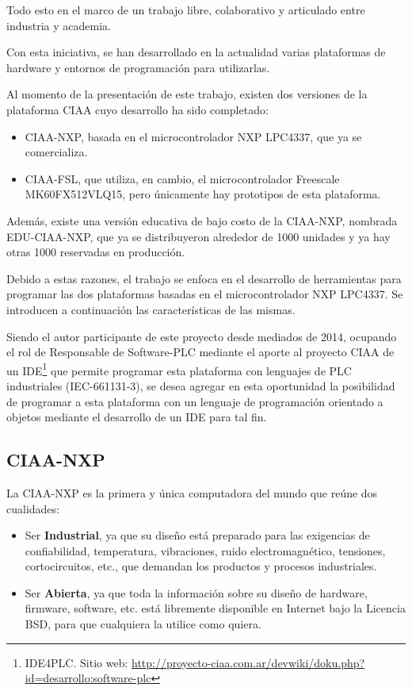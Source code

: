 \noindent Todo esto en el marco de un trabajo libre, colaborativo y articulado entre industria y academia. 

\bigskip

Con esta iniciativa, se han desarrollado en la actualidad varias plataformas de hardware y entornos de programación para utilizarlas.

\medskip

Al momento de la presentación de este trabajo, existen dos versiones de la plataforma CIAA cuyo desarrollo ha sido completado:

\begin{itemize}
\item 
CIAA-NXP, basada en el microcontrolador NXP LPC4337, que ya se comercializa.
\item 
CIAA-FSL, que utiliza, en cambio, el microcontrolador Freescale MK60FX512VLQ15, pero únicamente hay prototipos de esta plataforma. 
\end{itemize}

Además, existe una versión educativa de bajo costo de la CIAA-NXP, nombrada EDU-CIAA-NXP, que ya se distribuyeron alrededor de 1000 unidades y ya hay otras 1000 reservadas en producción. 

\medskip

Debido a estas razones, el trabajo se enfoca en el desarrollo de herramientas para programar las dos plataformas basadas en el microcontrolador NXP LPC4337. Se introducen a continuación las características de las mismas.




Siendo el autor participante de este proyecto desde mediados de 2014, ocupando el rol de Responsable de Software-PLC mediante el aporte al proyecto CIAA de un IDE\footnote{IDE4PLC. Sitio web: \url{http://proyecto-ciaa.com.ar/devwiki/doku.php?id=desarrollo:software-plc}} que permite programar esta plataforma con lenguajes de PLC industriales (IEC-661131-3), se desea agregar en esta oportunidad la posibilidad de programar a esta plataforma con un lenguaje de programación orientado a objetos mediante el desarrollo de un IDE para tal fin.


\subsection{CIAA-NXP}

La CIAA-NXP es la primera y única computadora del mundo que reúne dos cualidades:

\begin{itemize}
\item 
Ser \textbf{Industrial}, ya que su diseño está preparado para las exigencias de confiabilidad, temperatura, vibraciones, ruido electromagnético, tensiones, cortocircuitos, etc., que demandan los productos y procesos industriales.
\item 
Ser \textbf{Abierta}, ya que toda la información sobre su diseño de hardware, firmware, software, etc. está libremente disponible en Internet bajo la Licencia BSD, para que cualquiera la utilice como quiera.
\end{itemize}

